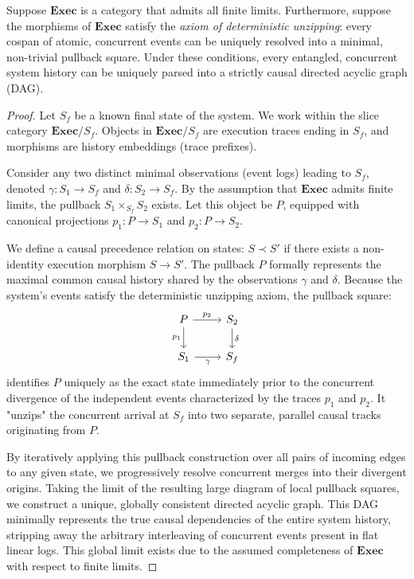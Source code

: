 \begin{theorem}
Suppose $\mathbf{Exec}$ is a category that admits all finite limits. Furthermore, suppose the morphisms of $\mathbf{Exec}$ satisfy the \emph{axiom of deterministic unzipping}: every cospan of atomic, concurrent events can be uniquely resolved into a minimal, non-trivial pullback square. Under these conditions, every entangled, concurrent system history can be uniquely parsed into a strictly causal directed acyclic graph (DAG).
\end{theorem}

\begin{proof}
Let $S_f$ be a known final state of the system. We work within the slice category $\mathbf{Exec}/S_f$. Objects in $\mathbf{Exec}/S_f$ are execution traces ending in $S_f$, and morphisms are history embeddings (trace prefixes).

Consider any two distinct minimal observations (event logs) leading to $S_f$, denoted $\gamma: S_1 \to S_f$ and $\delta: S_2 \to S_f$. 
By the assumption that $\mathbf{Exec}$ admits finite limits, the pullback $S_1 \times_{S_f} S_2$ exists. Let this object be $P$, equipped with canonical projections $p_1: P \to S_1$ and $p_2: P \to S_2$.

We define a causal precedence relation on states: $S \prec S'$ if there exists a non-identity execution morphism $S \to S'$.
The pullback $P$ formally represents the maximal common causal history shared by the observations $\gamma$ and $\delta$. 
Because the system's events satisfy the deterministic unzipping axiom, the pullback square:
\begin{equation}
\label{eq:replay_pullback}
\begin{tikzcd}
P \arrow[r, "p_2"] \arrow[d, "p_1"'] & S_2 \arrow[d, "\delta"] \\
S_1 \arrow[r, "\gamma"'] & S_f
\end{tikzcd}
\end{equation}
identifies $P$ uniquely as the exact state immediately prior to the concurrent divergence of the independent events characterized by the traces $p_1$ and $p_2$. It "unzips" the concurrent arrival at $S_f$ into two separate, parallel causal tracks originating from $P$.

By iteratively applying this pullback construction over all pairs of incoming edges to any given state, we progressively resolve concurrent merges into their divergent origins. Taking the limit of the resulting large diagram of local pullback squares, we construct a unique, globally consistent directed acyclic graph. This DAG minimally represents the true causal dependencies of the entire system history, stripping away the arbitrary interleaving of concurrent events present in flat linear logs. This global limit exists due to the assumed completeness of $\mathbf{Exec}$ with respect to finite limits.
\end{proof}


